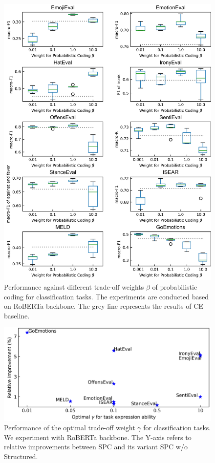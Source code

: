 \documentclass[letterpaper]{article} %
\begin{document}
\begin{figure}[!ht]
\centering
\includegraphics[width=0.98\linewidth]{figures/para_beta.png}  
\caption{Performance against different trade-off weights $\beta$ of probabilistic coding for classification tasks. The experiments are conducted based on RoBERTa backbone. The grey line represents the results of CE baseline.}
\label{fig:para}
\end{figure}
\begin{figure}[!ht]
\centering
\includegraphics[width=\linewidth]{figures/para_gamma.png}  
\caption{Performance of the optimal trade-off weight $\gamma$ for classification tasks. We experiment with RoBERTa backbone. The Y-axis refers to relative improvements between SPC and its variant SPC w/o Structured. }
\label{fig:para_gam}
\end{figure}
\end{document}
